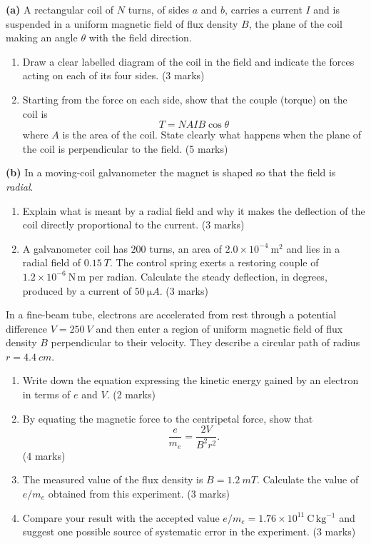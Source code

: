 \documentclass[11pt]{article}
\newcounter{popsec}
\newcounter{popsub}
\newcommand{\courssub}[1]{%
  \stepcounter{popsub}%
  \par\vspace{9pt}\noindent{\popxbold\fontsize{11.5}{13}\selectfont\color{popink}{\color{poporange}\thepopsec.\thepopsub}\hspace{6pt}#1}\par\nopagebreak\vspace{4pt}
}
\begin{document}
\courssub{I prepare for the GCE}

\begin{exercice}
\textbf{(a)} A rectangular coil of $N$ turns, of sides $a$ and $b$, carries a current $I$ and is suspended in a uniform magnetic field of flux density $B$, the plane of the coil making an angle $\theta$ with the field direction.
\begin{enumerate}
\item[(i)] Draw a clear labelled diagram of the coil in the field and indicate the forces acting on each of its four sides. \hfill (3 marks)
\item[(ii)] Starting from the force on each side, show that the couple (torque) on the coil is
\[ T = N A I B \cos\theta \]
where $A$ is the area of the coil. State clearly what happens when the plane of the coil is perpendicular to the field. \hfill (5 marks)
\end{enumerate}
\textbf{(b)} In a moving-coil galvanometer the magnet is shaped so that the field is \emph{radial}.
\begin{enumerate}
\item[(i)] Explain what is meant by a radial field and why it makes the deflection of the coil directly proportional to the current. \hfill (3 marks)
\item[(ii)] A galvanometer coil has $200$ turns, an area of $2.0 \times 10^{-4}\ \mathrm{m^2}$ and lies in a radial field of $\SI{0.15}{T}$. The control spring exerts a restoring couple of $1.2 \times 10^{-6}\ \mathrm{N\,m}$ per radian. Calculate the steady deflection, in degrees, produced by a current of $\SI{50}{\micro A}$. \hfill (3 marks)
\end{enumerate}
\end{exercice}

\begin{exercice}
In a fine-beam tube, electrons are accelerated from rest through a potential difference $V = \SI{250}{V}$ and then enter a region of uniform magnetic field of flux density $B$ perpendicular to their velocity. They describe a circular path of radius $r = \SI{4.4}{cm}$.
\begin{enumerate}
\item[(a)] Write down the equation expressing the kinetic energy gained by an electron in terms of $e$ and $V$. \hfill (2 marks)
\item[(b)] By equating the magnetic force to the centripetal force, show that
\[ \frac{e}{m_e} = \frac{2V}{B^2 r^2}. \]
\hfill (4 marks)
\item[(c)] The measured value of the flux density is $B = \SI{1.2}{mT}$. Calculate the value of $e/m_e$ obtained from this experiment. \hfill (3 marks)
\item[(d)] Compare your result with the accepted value $e/m_e = 1.76 \times 10^{11}\ \mathrm{C\,kg^{-1}}$ and suggest one possible source of systematic error in the experiment. \hfill (3 marks)
\end{enumerate}
\end{exercice}
\end{document}
